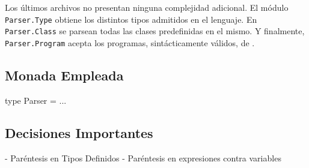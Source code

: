 Los últimos archivos no presentan ninguna complejidad adicional.
El módulo \lstinline[style = haskell]{Parser.Type} obtiene los distintos tipos admitidos en el lenguaje.
En \lstinline[style = haskell]{Parser.Class} se parsean todas las clases predefinidas en el mismo.
Y finalmente, \lstinline[style = haskell]{Parser.Program} acepta los programas, sintácticamente válidos, de \Lenguaje{}.

\iffalse
Megaparsec vs Parsec
Since Megaparsec is a fork of Parsec, we are bound to list the main differences between the two libraries:
  
  Better error messages. Megaparsec has typed error messages and custom error messages, it can also report multiple parse errors at once.
  
  Megaparsec can show the line on which parse error happened as part of parse error. This makes it a lot easier to figure out where the error happened.
  
  Some quirks and bugs of Parsec are fixed.
  
  Better support for Unicode parsing in Text.Megaparsec.Char.
  
  Megaparsec has more powerful combinators and can parse languages where indentation matters out-of-the-box.
  
  Better documentation.
  
  Megaparsec can recover from parse errors “on the fly” and continue parsing.
  
  Megaparsec allows us to conditionally process parse errors inside your parser before parsing is finished. In particular, it's possible to define regions in which parse errors, should they happen, will get a “context tag”, e.g. we could build a context stack like “in function definition foo”, “in expression x”, etc.
  
  Megaparsec is faster and supports efficient operations tokens, takeWhileP, takeWhile1P, takeP, like Attoparsec
\fi

\iffalse

\subsection{Monada Empleada}
type Parser = ...

\subsection{Decisiones Importantes}
- Paréntesis en Tipos Definidos
- Paréntesis en expresiones contra variables

